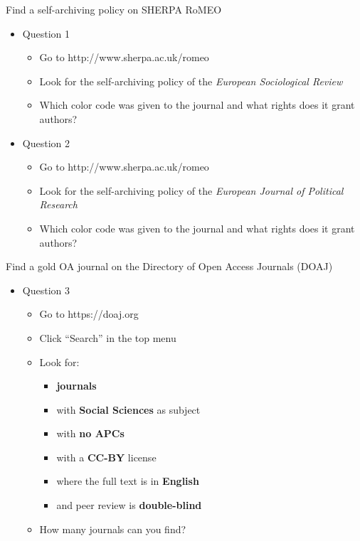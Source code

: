 \documentclass{beamer}
\begin{document}

\begin{frame}{Find a self-archiving policy on SHERPA RoMEO}
	\begin{itemize}
    	\item Question 1
        \begin{itemize}
    		\item Go to http://www.sherpa.ac.uk/romeo
        	\item Look for the self-archiving policy of the \textit{European Sociological Review}
            \item Which color code was given to the journal and what rights does it grant authors?
		\end{itemize}
        \item Question 2
        \begin{itemize}
    		\item Go to http://www.sherpa.ac.uk/romeo
        	\item Look for the self-archiving policy of the \textit{European Journal of Political Research}
            \item Which color code was given to the journal and what rights does it grant authors?
		\end{itemize}
	\end{itemize}
\end{frame}



\begin{frame}{Find a gold OA journal on the Directory of Open Access Journals (DOAJ)}
	\begin{itemize}
    	\item Question 3
        \begin{itemize}
    		\item Go to https://doaj.org
        	\item Click ``Search'' in the top menu
            \item Look for: 
            \begin{itemize}
    			\item \textbf{journals}
        		\item with \textbf{Social Sciences} as subject
            	\item with \textbf{no APCs}
                \item with a \textbf{CC-BY} license
                \item where the full text is in \textbf{English}
                \item and peer review is \textbf{double-blind}
		\end{itemize}
        \item How many journals can you find?
		\end{itemize}
	\end{itemize}
\end{frame}
\end{document}
